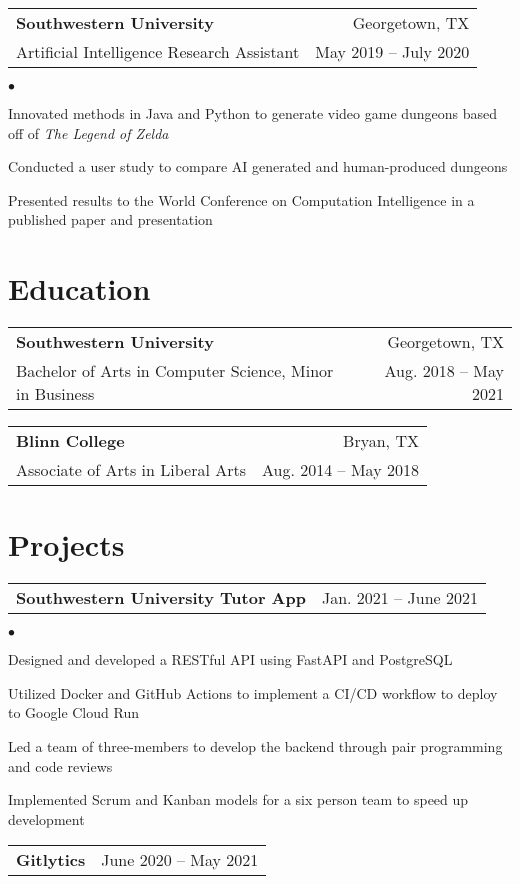 \documentclass[margin, line]{res}
\makeatletter
\newcommand{\resumeSubheading}[4]{

\begin{tabular*}{1.01\textwidth}{@{\hspace{-4pt}}l @{\extracolsep{\fill}} r}
\textbf{#1} & #2 \\
      #3 &  #4 
\end{tabular*}\vspace{-2pt}
}
\newcommand{\resumeSubSubheading}[2]{
\begin{tabular*}{1.01\textwidth}{@{\hspace{-4pt}}l @{\extracolsep{\fill}} r}
    #1 & #2 
\end{tabular*}\vspace{-7pt}
}
\newenvironment{list2}{
	\begin{list}{$\bullet$}{%
		\setlength{\itemsep}{0in}
		\setlength{\parsep}{0in} \setlength{\parskip}{0in}
		\setlength{\topsep}{0in} \setlength{\partopsep}{0in}
		\setlength{\leftmargin}{0.2in}}}{\end{list}}
\makeatother
\begin{document}
\begin{resume}
\resumeSubheading{Southwestern University}{Georgetown, TX}
             {Artificial Intelligence Research Assistant}{May 2019 -- July 2020}

\begin{list2}
\item{Innovated methods in Java and Python to generate video game dungeons based off of \emph{The Legend of Zelda}}
\item{Conducted a user study to compare AI generated and human-produced dungeons}
\item{Presented results to the World Conference on Computation Intelligence in a published paper and presentation}
\end{list2}

\section{\sc Education}

\vspace{2pt}

\resumeSubheading{Southwestern University}{Georgetown, TX}
             {Bachelor of Arts in Computer Science, Minor in Business}{Aug. 2018 -- May 2021}

\resumeSubheading{Blinn College}{Bryan, TX}
             {Associate of Arts in Liberal Arts}{Aug. 2014 -- May 2018}

\section{\sc Projects}

\resumeSubSubheading{\textbf{Southwestern University Tutor App}}{Jan. 2021 -- June 2021}

\begin{list2}
\item{Designed and developed a RESTful API using FastAPI and PostgreSQL}
\item{Utilized Docker and GitHub Actions to implement a CI/CD workflow to deploy to Google Cloud Run}
\item{Led a team of three-members to develop the backend through pair programming and code reviews}
\item{Implemented Scrum and Kanban models for a six person team to speed up development}
\end{list2}

\resumeSubSubheading{\textbf{Gitlytics}}{June 2020 -- May 2021}


\end{resume}
\end{document}
